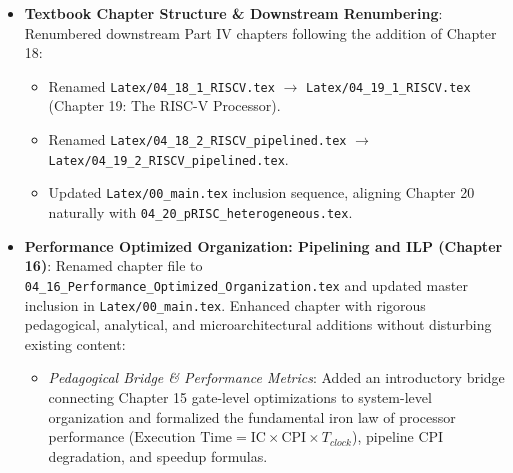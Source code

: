 \begin{itemize}
\begin{itemize}
        \item \textit{Taxonomy of Multithreading}: Analyzed fine-grained/interleaved (barrel) multithreading (citing Burton Smith on the Denelcor HEP, 1978), coarse-grained (blocked) multithreading, and Simultaneous Multithreading (SMT) (citing Dean Tullsen, Susan Eggers, and Henry Levy, ISCA 1995).
        \item \textit{Microarchitectural Resource Partitioning}: Detailed the trade-offs between statically partitioned resources (instruction queues, reorder buffer partitions, return address stacks) and dynamically shared execution resources (physical register files, ALUs/FPUs, TLBs, and caches).
        \item \textit{Architectural Touchpoints}: Examined hardware thread identification (\texttt{mhartid} CSR), atomic memory operations (Load-Reserved/Store-Conditional and AMOs in the RISC-V `A' extension), memory fence instructions (\texttt{FENCE}, \texttt{FENCE.I}), and memory consistency models (RVWMO and TSO).
    \end{itemize}
    \item \textbf{Textbook Chapter Structure \& Downstream Renumbering}: Renumbered downstream Part IV chapters following the addition of Chapter 18:
    \begin{itemize}
        \item Renamed \texttt{Latex/04\_18\_1\_RISCV.tex} $\rightarrow$ \texttt{Latex/04\_19\_1\_RISCV.tex} (Chapter 19: The RISC-V Processor).
        \item Renamed \texttt{Latex/04\_18\_2\_RISCV\_pipelined.tex} $\rightarrow$ \texttt{Latex/04\_19\_2\_RISCV\_pipelined.tex}.
        \item Updated \texttt{Latex/00\_main.tex} inclusion sequence, aligning Chapter 20 naturally with \texttt{04\_20\_pRISC\_heterogeneous.tex}.
    \end{itemize}
    \item \textbf{Performance Optimized Organization: Pipelining and ILP (Chapter 16)}: Renamed chapter file to \texttt{04\_16\_Performance\_Optimized\_Organization.tex} and updated master inclusion in \texttt{Latex/00\_main.tex}. Enhanced chapter with rigorous pedagogical, analytical, and microarchitectural additions without disturbing existing content:
    \begin{itemize}
        \item \textit{Pedagogical Bridge \& Performance Metrics}: Added an introductory bridge connecting Chapter 15 gate-level optimizations to system-level organization and formalized the fundamental iron law of processor performance ($\text{Execution Time} = \text{IC} \times \text{CPI} \times T_{clock}$), pipeline CPI degradation, and speedup formulas.

\end{itemize}
\end{itemize}
